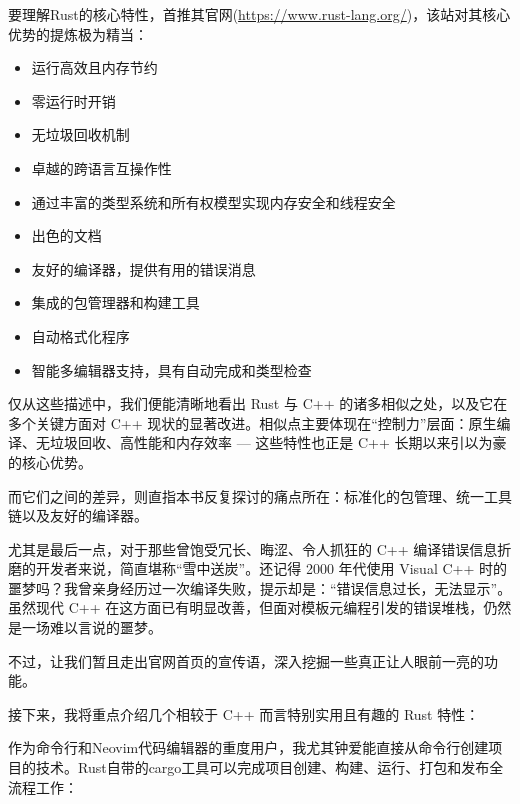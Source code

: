 
要理解Rust的核心特性，首推其官网(\url{https://www.rust-lang.org/})，该站对其核心优势的提炼极为精当：

\begin{itemize}
\item 
运行高效且内存节约

\item 
零运行时开销

\item 
无垃圾回收机制

\item 
卓越的跨语言互操作性

\item 
通过丰富的类型系统和所有权模型实现内存安全和线程安全

\item 
出色的文档

\item 
友好的编译器，提供有用的错误消息

\item 
集成的包管理器和构建工具

\item 
自动格式化程序

\item 
智能多编辑器支持，具有自动完成和类型检查
\end{itemize}

仅从这些描述中，我们便能清晰地看出 Rust 与 C++ 的诸多相似之处，以及它在多个关键方面对 C++ 现状的显著改进。相似点主要体现在“控制力”层面：原生编译、无垃圾回收、高性能和内存效率 --- 这些特性也正是 C++ 长期以来引以为豪的核心优势。

而它们之间的差异，则直指本书反复探讨的痛点所在：标准化的包管理、统一工具链以及友好的编译器。

尤其是最后一点，对于那些曾饱受冗长、晦涩、令人抓狂的 C++ 编译错误信息折磨的开发者来说，简直堪称“雪中送炭”。还记得 2000 年代使用 Visual C++ 时的噩梦吗？我曾亲身经历过一次编译失败，提示却是：“错误信息过长，无法显示”。虽然现代 C++ 在这方面已有明显改善，但面对模板元编程引发的错误堆栈，仍然是一场难以言说的噩梦。

不过，让我们暂且走出官网首页的宣传语，深入挖掘一些真正让人眼前一亮的功能。

接下来，我将重点介绍几个相较于 C++ 而言特别实用且有趣的 Rust 特性：


作为命令行和Neovim代码编辑器的重度用户，我尤其钟爱能直接从命令行创建项目的技术。Rust自带的cargo工具可以完成项目创建、构建、运行、打包和发布全流程工作：

